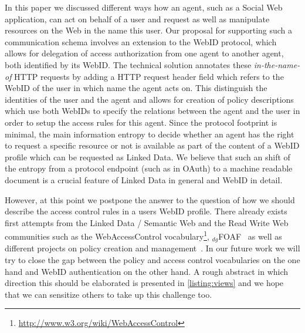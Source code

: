 \documentclass[a4paper]{llncs}
\begin{document}
In this paper we discussed different ways how an agent, such as a Social Web application, can act on behalf of a user and request as well as manipulate resources on the Web in the name this user.
Our proposal for supporting such a communication schema involves an extension to the WebID protocol, which allows for delegation of access authorization from one agent to another agent, both identified by its WebID.
The technical solution annotates these \textit{in-the-name-of} HTTP requests by adding a HTTP request header field which refers to the WebID of the user in which name the agent acts on.
This distinguish the identities of the user and the agent and allows for creation of policy descriptions which use both WebIDs to specify the relations between the agent and the user in order to setup the access rules for this agent.
Since the protocol footprint is minimal, the main information entropy to decide whether an agent has the right to request a specific resource or not is available as part of the content of a WebID profile which can be requested as Linked Data.
We believe that such an shift of the entropy from a protocol endpoint (such as in OAuth) to a machine readable document is a crucial feature of Linked Data in general and WebID in detail.

However, at this point we postpone the answer to the question of how we should describe the access control rules in a users WebID profile.
There already exists first attempts from the Linked Data / Semantic Web and the Read Write Web communities such as the WebAccessControl vocabulary\footnote{\url{http://www.w3.org/wiki/WebAccessControl}}, $_{dg}$FOAF~\cite{schwagereit-f-2010-181-a} as well as different projects on policy creation and management~\cite{kagal-l-2005--a,kagal-l-2005--b}.
In our future work we will try to close the gap between the policy and access control vocabularies on the one hand and WebID authentication on the other hand.
A rough abstract in which direction this should be elaborated is presented in \autoref{listing:views} and we hope that we can sensitize others to take up this challenge too.



\end{document}
